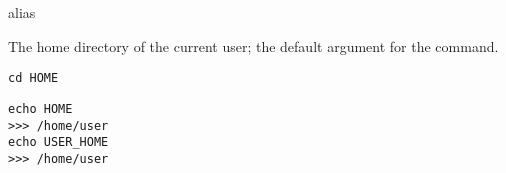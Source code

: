 %
 alias 

The home directory of the current user; the default argument for
the  command.

\begin{lstlisting}[style=Groovybash, label={lst:example_user_home}, title={
Change the current working directory to the home directory of the current user.}]
cd HOME
\end{lstlisting}

\begin{lstlisting}[style=Groovybash, label={lst:example_user_home}, title={
Print the home directory of the current user.}]
echo HOME
>>> /home/user
echo USER_HOME
>>> /home/user
\end{lstlisting}

